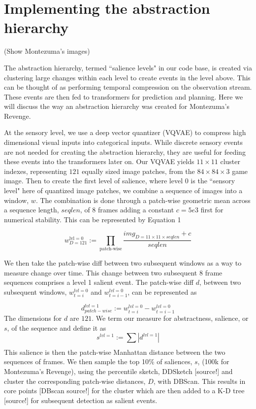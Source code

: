 \documentclass{article}
\begin{document}
\section{Implementing the abstraction hierarchy}
\label{sec:abstraction-hierarchy}

(Show Montezuma's images)

The abstraction hierarchy, termed \textquotedblleft salience levels" in our code base, is created via clustering large changes within each level to create events in the level above. This can be thought of as performing temporal compression on the observation stream. These events are then fed to transformers for prediction and planning. Here we will discuss the way an abstraction hierarchy was created for Montezuma's Revenge.

At the sensory level, we use a deep vector quantizer (VQVAE) \cite{source} to compress high dimensional visual inputs into categorical inputs. While discrete sensory events are not needed for creating the abstraction hierarchy, they are useful for feeding these events into the transformers later on. Our VQVAE yields $11 \times 11$ cluster indexes, representing $121$ equally sized image patches, from the $84 \times 84 \times 3$ game image. Then to create the first level of salience, where level $0$ is the \textquotedblleft sensory level" here of quantized image patches, we combine a sequence of images into a window, $w$. The combination is done through a patch-wise geometric mean across a sequence length, $seqlen$, of 8 frames adding a constant $c=5e3$ first for numerical stability. This can be represented by
Equation 1

\[
    w_{D=121}^{\text{lvl}=0} :=
    \prod_{\text{patch-wise}} \frac{
        img_{D=11 \times 11\times seqlen} + c
    }{seqlen}
\]


We then take the patch-wise diff between two subsequent windows as a way to measure change over time. This change between two subsequent 8 frame sequences comprises a level 1 salient event. The patch-wise diff $d$, between two subsequent windows, $w^{lvl=0}_{t=i}$ and $w^{lvl=0}_{t=i-1}$, can be represented as

\[
d^{lvl=1}_{patch-wise} :=  w^{lvl=0}_{t=i} - w^{lvl=0}_{t=i-1}
\]
The dimensions for $d$ are $121$. We term our measure for abstractness, salience, or $s$, of the sequence and define it as
\[
s^{lvl=1} := \sum_{} \left| d^{lvl=1} \right|
\]
This salience is then the patch-wise Manhattan distance between the two sequences of frames. We then sample the top 10\% of saliences,  $s$,  (100k for Montezuma's Revenge), using the percentile sketch, DDSketch [source!] and cluster the corresponding patch-wise distances, $D$, with DBScan. This results in core points [DBscan source!] for the cluster which are then added to a K-D tree [source!] for subsequent detection as salient events.
\end{document}
